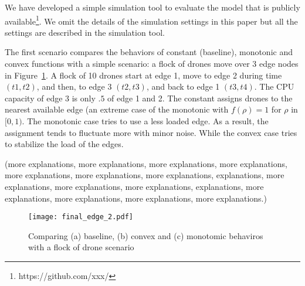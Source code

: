 
We have developed a simple simulation tool to evaluate the model
that is publicly available\footnote{https://github.com/xxx/}.
We omit the details of the simulation settings in this paper but all
the settings are described in the simulation tool.


The first scenario compares the behaviors of constant (baseline), monotonic and
convex functions with a simple scenario: a flock of drones move
over 3 edge nodes in Figure~\ref{fig:edge}.
A flock of 10 drones start at edge 1, move to edge 2 during time
$(t1, t2)$, and then, to edge 3 $(t2, t3)$, and back to edge 1 $(t3, t4)$.
The CPU capacity of edge 3 is only $.5$ of edge 1 and 2.
The constant assigns drones to the nearest available edge (an extreme
case of the monotonic with $f(\rho) = 1$ for $\rho$ in $[0,1)$.
The monotonic case tries to use a less loaded edge. As a result,
the assignment tends to fluctuate more with minor noise.
While the convex case tries to stabilize the load of the edges.

(more explanations, more explanations, more explanations, more
explanations, more explanations, more explanations, more explanations,
explanations, more explanations, more explanations, more explanations,
explanations, more explanations, more explanations, more explanations,
more explanations.)

\begin{figure}[tb]
  \begin{center}
    \texttt{[image: final\_edge\_2.pdf]}
    \vspace{-4.0ex}
    \caption{Comparing (a) baseline, (b) convex and (c) monotomic behaviros with
      a flock of drone scenario}
    \smallskip
    \raggedright
    \small
    \label{fig:edge}
  \end{center}
\end{figure}

